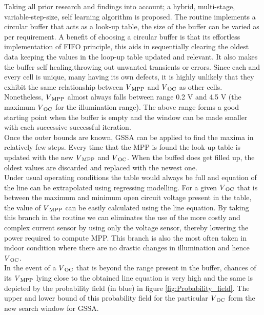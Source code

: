 Taking all prior research and findings into account; a hybrid, multi-stage, variable-step-size, self learning algorithm is proposed. The routine implements a circular buffer that acts as a look-up table, the size of the buffer can be varied as per requirement. A benefit of choosing a circular buffer is that its effortless implementation of \ac{FIFO} principle, this aids in sequentially clearing the oldest data keeping the values in the loop-up table updated and relevant. It also makes the buffer self healing,throwing out unwanted transients or errors. Since each and every cell is unique, many having its own defects, it is highly unlikely that they exhibit the same relationship between $V\textsubscript{MPP}$ and $V\textsubscript{OC}$ as other cells. Nonetheless, $V\textsubscript{MPP}$ almost always falls between range 0.2 V and 4.5 V (the maximum $V\textsubscript{OC}$ for the illumination range). The above range forms a good starting point when the buffer is empty and the window can be made smaller with each successive successful iteration.\\

Once the outer bounds are known, \ac{GSSA} can be applied to find the maxima in relatively few steps. Every time that the \ac{MPP} is found the look-up table is updated with the new $V\textsubscript{MPP}$ and $V\textsubscript{OC}$. When the buffed does get filled up, the oldest values are discarded and replaced with the newest one.\\

 Under usual operating conditions the table would always be full and equation of the line can be extrapolated using regressing modelling. For a given $V\textsubscript{OC}$ that is between the maximum and minimum open circuit voltage present in the table, the value of $V\textsubscript{MPP}$ can be easily calculated using the line equation. By taking this branch in the routine we can eliminates the use of the more costly and complex current sensor \cite{urayai2011single} by using only the voltage sensor, thereby lowering the power required to compute \ac{MPP}. This branch is also the most often taken in indoor condition where there are no drastic changes in illumination and hence $V\textsubscript{OC}$.  \\  
         
 In the event of a $V\textsubscript{OC}$ that is beyond the range present in the buffer, chances of its $V\textsubscript{MPP}$ lying close to the obtained line equation is very high and the same is depicted by the probability field (in blue) in figure \ref{fig:Probability_field}. The upper and lower bound of this probability field for the particular $V\textsubscript{OC}$ form the new search window for \ac{GSSA}.\\
 
